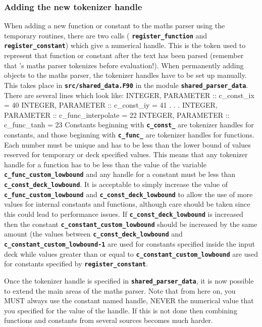 \documentclass[12pt,a4paper]{article}
\newcommand{\inlinecode}[1]{{\color{warwickred} \bf\texttt{#1}}}
\newcommand{\EPOCH}{{\color{warwickdark}\fontfamily{phv}\selectfont{EPOCH}}}
\newenvironment{boxverbatim}{\lboxverbatim{none}}{\endlboxverbatim}
\begin{document}
\subsubsection{Adding the new tokenizer handle}
When adding a new function or constant to the maths parser using the temporary
routines, there are two calls (\inlinecode{register\_function} and
\inlinecode{register\_constant}) which give a numerical handle. This is the
token used to represent that function or constant after the text has been parsed
(remember that {\EPOCH}'s maths parser tokenizes before evaluation!). When
permanently adding objects to the maths parser, the tokenizer handles have to
be set up manually. This takes place in \inlinecode{src/shared\_data.F90} in
the module \inlinecode{shared\_parser\_data}. There are several lines which
look like:
\begin{boxverbatim}
  INTEGER, PARAMETER :: c_const_ix = 40
  INTEGER, PARAMETER :: c_const_iy = 41
  .
  .
  .
  INTEGER, PARAMETER :: c_func_interpolate = 22
  INTEGER, PARAMETER :: c_func_tanh = 23
\end{boxverbatim}
Constants beginning with \inlinecode{c\_const\_} are tokenizer handles for
constants, and those beginning with \inlinecode{c\_func\_} are tokenizer handles
for functions. Each number must be unique and has to be less than
the lower bound of values reserved for temporary or deck
specified values. This means that any tokenizer handle for a function has to be
less than the value of the variable \inlinecode{c\_func\_custom\_lowbound} and
any handle for a constant must be less than
\inlinecode{c\_const\_deck\_lowbound}. It is acceptable to simply increase the
value of \inlinecode{c\_func\_custom\_lowbound} and
\inlinecode{c\_const\_deck\_lowbound} to
allow the use of more values for internal constants and functions, although
care should be taken since this could lead to performance issues.
If \inlinecode{c\_const\_deck\_lowbound} is increased then the constant
\inlinecode{c\_constant\_custom\_lowbound} should be increased by the same
amount (the values between \inlinecode{c\_const\_deck\_lowbound} and
\inlinecode{c\_constant\_custom\_lowbound-1} are used for constants specified
inside the input deck while values greater than or equal to
\inlinecode{c\_constant\_custom\_lowbound} are used for constants specified
by \inlinecode{register\_constant}.

Once the tokenizer handle is specified in \inlinecode{shared\_parser\_data}, it
is now possible to extend the main areas of the maths parser. Note that from
here on, you MUST always use the constant named handle, NEVER the numerical
value that you specified for the value of the handle. If this is not done
then combining functions and constants from several sources becomes much harder.
\end{document}
